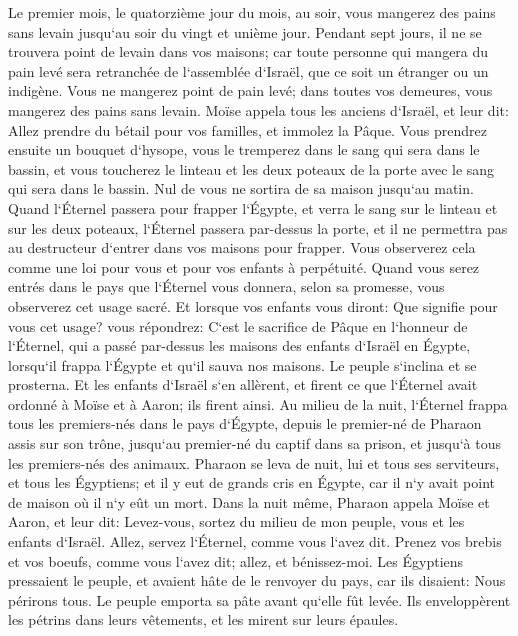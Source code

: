 \verse Le premier mois, le quatorzième jour du mois, au soir, vous mangerez des pains sans levain jusqu`au soir du vingt et unième jour. 
\verse Pendant sept jours, il ne se trouvera point de levain dans vos maisons; car toute personne qui mangera du pain levé sera retranchée de l`assemblée d`Israël, que ce soit un étranger ou un indigène. 
\verse Vous ne mangerez point de pain levé; dans toutes vos demeures, vous mangerez des pains sans levain. 
\verse Moïse appela tous les anciens d`Israël, et leur dit: Allez prendre du bétail pour vos familles, et immolez la Pâque. 
\verse Vous prendrez ensuite un bouquet d`hysope, vous le tremperez dans le sang qui sera dans le bassin, et vous toucherez le linteau et les deux poteaux de la porte avec le sang qui sera dans le bassin. Nul de vous ne sortira de sa maison jusqu`au matin. 
\verse Quand l`Éternel passera pour frapper l`Égypte, et verra le sang sur le linteau et sur les deux poteaux, l`Éternel passera par-dessus la porte, et il ne permettra pas au destructeur d`entrer dans vos maisons pour frapper. 
\verse Vous observerez cela comme une loi pour vous et pour vos enfants à perpétuité. 
\verse Quand vous serez entrés dans le pays que l`Éternel vous donnera, selon sa promesse, vous observerez cet usage sacré. 
\verse Et lorsque vos enfants vous diront: Que signifie pour vous cet usage? 
\verse vous répondrez: C`est le sacrifice de Pâque en l`honneur de l`Éternel, qui a passé par-dessus les maisons des enfants d`Israël en Égypte, lorsqu`il frappa l`Égypte et qu`il sauva nos maisons. Le peuple s`inclina et se prosterna. 
\verse Et les enfants d`Israël s`en allèrent, et firent ce que l`Éternel avait ordonné à Moïse et à Aaron; ils firent ainsi. 
\verse Au milieu de la nuit, l`Éternel frappa tous les premiers-nés dans le pays d`Égypte, depuis le premier-né de Pharaon assis sur son trône, jusqu`au premier-né du captif dans sa prison, et jusqu`à tous les premiers-nés des animaux. 
\verse Pharaon se leva de nuit, lui et tous ses serviteurs, et tous les Égyptiens; et il y eut de grands cris en Égypte, car il n`y avait point de maison où il n`y eût un mort. 
\verse Dans la nuit même, Pharaon appela Moïse et Aaron, et leur dit: Levez-vous, sortez du milieu de mon peuple, vous et les enfants d`Israël. Allez, servez l`Éternel, comme vous l`avez dit. 
\verse Prenez vos brebis et vos boeufs, comme vous l`avez dit; allez, et bénissez-moi. 
\verse Les Égyptiens pressaient le peuple, et avaient hâte de le renvoyer du pays, car ils disaient: Nous périrons tous. 
\verse Le peuple emporta sa pâte avant qu`elle fût levée. Ils enveloppèrent les pétrins dans leurs vêtements, et les mirent sur leurs épaules. 
